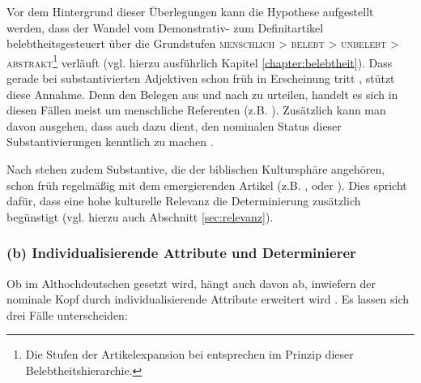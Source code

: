 Vor dem Hintergrund dieser Überlegungen kann die Hypothese aufgestellt werden, dass der Wandel vom Demonstrativ- zum Definitartikel belebtheitsgesteuert über die Grundstufen \textsc{menschlich > belebt > unbelebt > abstrakt}\footnote{Die Stufen der Artikelexpansion bei \textcite[34ff.]{Hodler1954} entsprechen im Prinzip dieser Belebtheitshierarchie.} verläuft (vgl. hierzu ausführlich Kapitel \ref{chapter:belebtheit}). Dass  gerade bei substantivierten Adjektiven schon früh in Erscheinung tritt \parencite[44]{Ebert1978}, stützt diese Annahme. Denn den Belegen aus \textcite[55f.]{Jager1917} und \textcite[75f.]{Oubouzar1992} nach zu urteilen, handelt es sich in diesen Fällen meist um menschliche Referenten (z.B.    ). Zusätzlich kann man davon ausgehen, dass  auch dazu dient, den nominalen Status dieser Substantivierungen kenntlich zu machen \parencite[vgl. auch][174]{Leiss2000}. 

Nach \textcite[45]{Hodler1954} stehen zudem Substantive, die der biblischen Kultursphäre angehören, schon früh regelmäßig mit dem emergierenden Artikel (z.B.  ,   oder  ). Dies spricht dafür, dass eine hohe kulturelle Relevanz die Determinierung zusätzlich begünstigt (vgl. hierzu auch Abschnitt \ref{sec:relevanz}).   

\subsubsection{(b) Individualisierende Attribute und Determinierer} 

Ob  im Althochdeutschen gesetzt wird, hängt auch davon ab, inwiefern der nominale Kopf durch individualisierende Attribute erweitert wird \parencite[vgl.][]{Graf1905,Witzig1910,Jager1917,Hodler1954,Oubouzar1992,Oubouzar1997,Schrodt2004,Szczepaniak2015}. Es lassen sich drei Fälle unterscheiden: 

